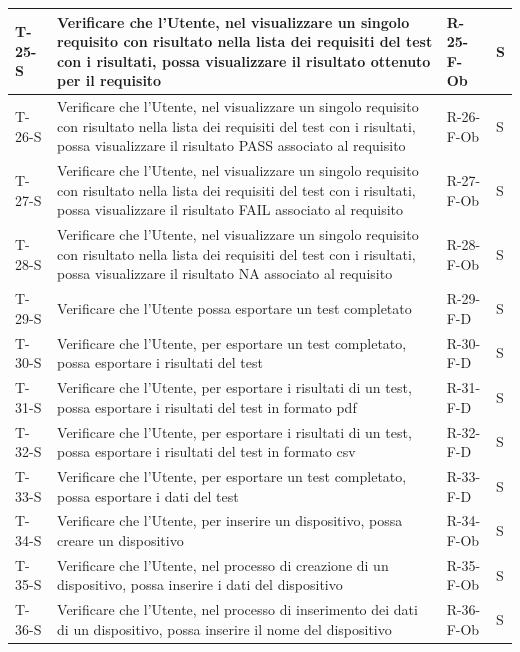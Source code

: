 \documentclass[a4paper,12pt]{article}
\begin{document}
{{\begin{longtable}{|p{}|p{}|p{}|p{}|}
                T-25-S & Verificare che l'Utente, nel visualizzare un singolo requisito con risultato nella lista dei requisiti del test con i risultati, possa visualizzare il risultato ottenuto per il requisito & R-25-F-Ob & S \\ \hline
                T-26-S & Verificare che l'Utente, nel visualizzare un singolo requisito con risultato nella lista dei requisiti del test con i risultati, possa visualizzare il risultato PASS associato al requisito & R-26-F-Ob & S \\ \hline
                T-27-S & Verificare che l'Utente, nel visualizzare un singolo requisito con risultato nella lista dei requisiti del test con i risultati, possa visualizzare il risultato FAIL associato al requisito & R-27-F-Ob & S \\ \hline
                T-28-S & Verificare che l'Utente, nel visualizzare un singolo requisito con risultato nella lista dei requisiti del test con i risultati, possa visualizzare il risultato NA associato al requisito & R-28-F-Ob & S \\ \hline
                T-29-S & Verificare che l'Utente possa esportare un test completato & R-29-F-D & S \\ \hline
                T-30-S & Verificare che l'Utente, per esportare un test completato, possa esportare i risultati del test & R-30-F-D & S \\ \hline
                T-31-S & Verificare che l'Utente, per esportare i risultati di un test, possa esportare i risultati del test in formato pdf & R-31-F-D & S \\ \hline
                T-32-S & Verificare che l'Utente, per esportare i risultati di un test, possa esportare i risultati del test in formato csv & R-32-F-D & S \\ \hline
                T-33-S & Verificare che l'Utente, per esportare un test completato, possa esportare i dati del test & R-33-F-D & S \\ \hline
                T-34-S & Verificare che l'Utente, per inserire un dispositivo, possa creare un dispositivo & R-34-F-Ob & S \\ \hline
                T-35-S & Verificare che l'Utente, nel processo di creazione di un dispositivo, possa inserire i dati del dispositivo & R-35-F-Ob & S \\ \hline
                T-36-S & Verificare che l'Utente, nel processo di inserimento dei dati di un dispositivo, possa inserire il nome del dispositivo & R-36-F-Ob & S \\ \hline

\end{longtable}}}
\end{document}
